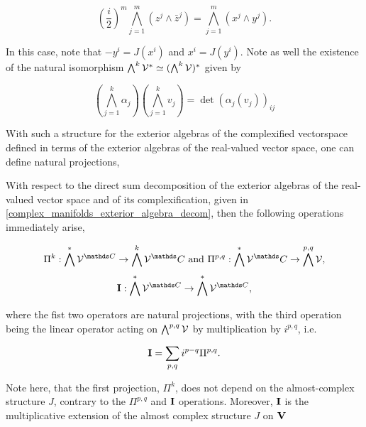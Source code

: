\[
    \left(\frac{i}{2}\right)^m \bigwedge_{j = 1}^{m} (z^j \land \bar{z}^j) = \bigwedge_{j=1}^{m} (x^j \land y^j).
\]

In this case, note that $ -y^i = J(x^i)$ and $x^i = J(y^i)$. 
Note as well the existence of the natural isomorphism $\bigwedge^{k} \mathcal{V}^* \simeq (\bigwedge^{k} \mathcal{V})^{*}$ given by 

\[
    (\bigwedge_{j=1}^{k} \alpha_j) (\bigwedge_{j=1}^{k} v_j) = \det (\alpha_j(v_j))_{ij}
\]

\blanky \medbreak

With such a structure for the exterior algebras of the complexified vectorspace defined in terms of the exterior algebras of the real-valued vector space, one can define natural projections, 

\begin{df}
    With respect to the direct sum decomposition of the exterior algebras of the real-valued vector space and of its complexification, given in \cref{complex_manifolds_exterior_algebra_decom}, 
    then the following operations immediately arise,

    \begin{equation*}
        \Pi^{k}: \bigwedge^{*} \vectorspace^{\C} \rightarrow \bigwedge^{k} \vectorspace^\C \textnormal{  and  } \Pi^{p,q}: \bigwedge^{*} \vectorspace^\C \rightarrow \bigwedge^{p,q} \vectorspace,
    \end{equation*}
    \begin{equation*}
        {\bf I}: \bigwedge^{*} \vectorspace^{\C} \rightarrow \bigwedge^{*} \vectorspace^{\C},   
    \end{equation*}

    where the fist two operators are natural projections, with the third operation being the linear operator acting on $\bigwedge^{p,q} \mathcal{V}$ by multiplication by $i^{p,q}$, i.e.

    \[
        {\bf I} = \sum_{p,q} i^{p-q} \Pi^{p,q}.
    \]
    
\end{df}

\begin{remark}
\end{remark}

Note here, that the first projection, $\Pi^{k}$, does not depend on the almost-complex structure $J$, contrary to the ${\Pi^{p,q}}$ and ${\bf I}$ operations. 
Moreover, ${\bf I}$ is the multiplicative extension of the almost complex structure $J$ on ${\bf V}$



